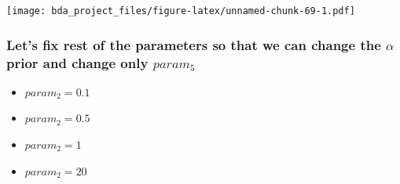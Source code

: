\documentclass[
]{article}
\providecommand{\tightlist}{%
  \setlength{\itemsep}{0pt}\setlength{\parskip}{0pt}}
\begin{document}
\texttt{[image: bda\_project\_files/figure-latex/unnamed-chunk-69-1.pdf]}

\hypertarget{lets-fix-rest-of-the-parameters-so-that-we-can-change-the-alpha-prior-and-change-only-param_5}{%
\subsubsection{\texorpdfstring{Let's fix rest of the parameters so that
we can change the \(\alpha\) prior and change only
\(param_5\)}{Let's fix rest of the parameters so that we can change the \textbackslash alpha prior and change only param\_5}}\label{lets-fix-rest-of-the-parameters-so-that-we-can-change-the-alpha-prior-and-change-only-param_5}}

\begin{itemize}
\tightlist
\item
  \(param_2 = 0.1\)
\item
  \(param_2 = 0.5\)
\item
  \(param_2 = 1\)
\item
  \(param_2 = 20\)
\end{itemize}
\end{document}
